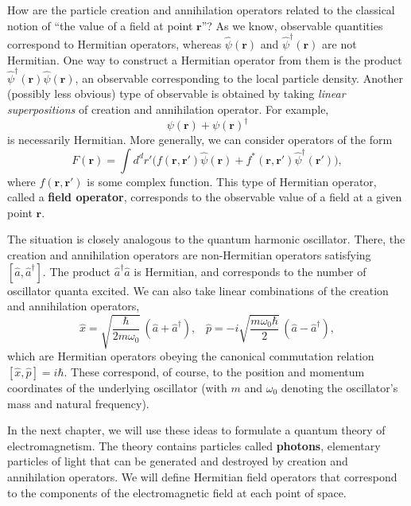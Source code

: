 \documentclass[pra,12pt]{revtex4}
\begin{document}
How are the particle creation and annihilation operators related to
the classical notion of ``the value of a field at point
$\mathbf{r}$''?  As we know, observable quantities correspond to
Hermitian operators, whereas $\hat{\psi}(\mathbf{r})$ and
$\hat{\psi}^\dagger(\mathbf{r})$ are not Hermitian.  One way to
construct a Hermitian operator from them is the product
$\hat{\psi}^\dagger(\mathbf{r})\hat{\psi}(\mathbf{r})$, an observable
corresponding to the local particle density.  Another (possibly less
obvious) type of observable is obtained by taking \textit{linear
  superpositions} of creation and annihilation operator.  For example,
\begin{equation*}
  \psi(\mathbf{r}) + \psi(\mathbf{r})^\dagger
\end{equation*}
is necessarily Hermitian.  More generally, we can consider operators
of the form
\begin{equation}
  F(\mathbf{r}) = \int d^dr' \Big(f(\mathbf{r},\mathbf{r}') \hat{\psi}(\mathbf{r}) + f^*(\mathbf{r},\mathbf{r}') \hat{\psi}^\dagger(\mathbf{r}') \Big),
\end{equation}
where $f(\mathbf{r},\mathbf{r}')$ is some complex function.  This type
of Hermitian operator, called a \textbf{field operator}, corresponds
to the observable value of a field at a given point $\mathbf{r}$.

The situation is closely analogous to the quantum harmonic oscillator.
There, the creation and annihilation operators are non-Hermitian
operators satisfying $[\hat{a},\hat{a}^\dagger]$.  The product
$\hat{a}^\dagger\hat{a}$ is Hermitian, and corresponds to the number
of oscillator quanta excited.  We can also take linear combinations of
the creation and annihilation operators,
\begin{equation}
  \hat{x} = \sqrt{\frac{\hbar}{2m\omega_0}} \, \left(\hat{a}+\hat{a}^\dagger\right), \;\;\;\hat{p} = -i \sqrt{\frac{m\omega_0\hbar}{2}} \, \left(\hat{a}-\hat{a}^\dagger\right),
\end{equation}
which are Hermitian operators obeying the canonical commutation
relation $[\hat{x},\hat{p}] = i\hbar$.  These correspond, of course,
to the position and momentum coordinates of the underlying oscillator
(with $m$ and $\omega_0$ denoting the oscillator's mass and natural
frequency).

In the next chapter, we will use these ideas to formulate a quantum
theory of electromagnetism.  The theory contains particles called
\textbf{photons}, elementary particles of light that can be generated
and destroyed by creation and annihilation operators.  We will define
Hermitian field operators that correspond to the components of the
electromagnetic field at each point of space.
\end{document}
